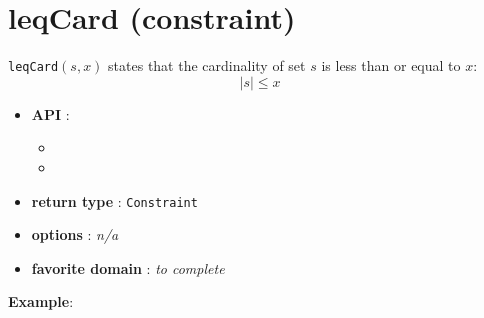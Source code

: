 \label{leqcard}
\hypertarget{leqcard}{}

\section{leqCard (constraint)}\label{leqcard:leqcardconstraint}\hypertarget{leqcard:leqcardconstraint}{}
\begin{notedef}
  \texttt{leqCard}$(s,x)$ states that the cardinality of set $s$ is less than or equal to $x$:
$$|s| \le x$$
\end{notedef}

\begin{itemize}
	\item \textbf{API} :
	\begin{itemize}
		\item {}
		\item {}
	\end{itemize}
	\item \textbf{return type} : \texttt{Constraint}
	\item \textbf{options} : \emph{n/a}
	\item \textbf{favorite domain} : \emph{to complete}
\end{itemize}

\textbf{Example}:

